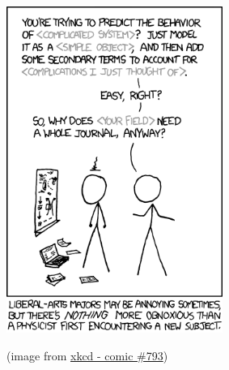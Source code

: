 
%
%


\begin{topic}



\vfil

\begin{center}
\begin{minipage}{200pt}
	\includegraphics*[width=200pt]{images/chap2-xkcd.png}

	\hfill {\footnotesize (image from \href{https://www.xkcd.com/793/}{xkcd - comic \#793})}
\end{minipage}
\end{center}



\end{topic}




%
%


